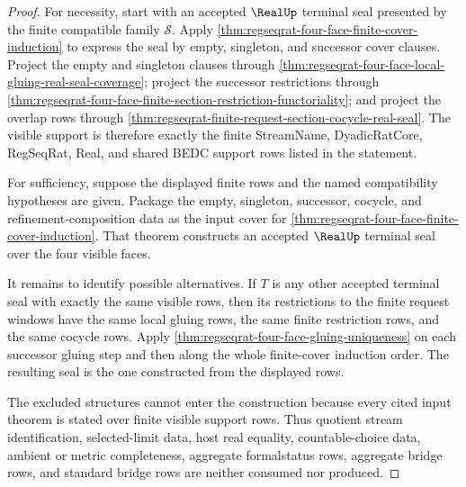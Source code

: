 \begin{proof}
For necessity, start with an accepted $\RealUp$ terminal seal presented by the
finite compatible family $\mathcal{S}$. Apply
\autoref{thm:regseqrat-four-face-finite-cover-induction} to express the seal
by empty, singleton, and successor cover clauses. Project the empty and
singleton clauses through
\autoref{thm:regseqrat-four-face-local-gluing-real-seal-coverage}; project
the successor restrictions through
\autoref{thm:regseqrat-four-face-finite-section-restriction-functoriality};
and project the overlap rows through
\autoref{thm:regseqrat-finite-request-section-cocycle-real-seal}. The visible
support is therefore exactly the finite StreamName, DyadicRatCore,
RegSeqRat, Real, and shared BEDC support rows listed in the statement.

For sufficiency, suppose the displayed finite rows and the named compatibility
hypotheses are given. Package the empty, singleton, successor, cocycle, and
refinement-composition data as the input cover for
\autoref{thm:regseqrat-four-face-finite-cover-induction}. That theorem
constructs an accepted $\RealUp$ terminal seal over the four visible faces.

It remains to identify possible alternatives. If $T$ is any other accepted
terminal seal with exactly the same visible rows, then its restrictions to the
finite request windows have the same local gluing rows, the same finite
restriction rows, and the same cocycle rows. Apply
\autoref{thm:regseqrat-four-face-gluing-uniqueness} on each successor gluing
step and then along the whole finite-cover induction order. The resulting
seal is the one constructed from the displayed rows.

The excluded structures cannot enter the construction because every cited
input theorem is stated over finite visible support rows. Thus quotient stream
identification, selected-limit data, host real equality, countable-choice
data, ambient or metric completeness, aggregate formalstatus rows, aggregate
bridge rows, and standard bridge rows are neither consumed nor produced.
\end{proof}

